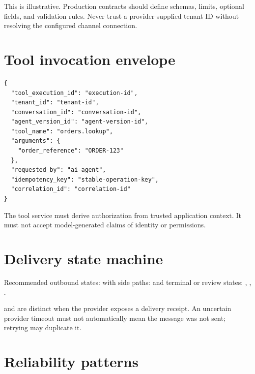 This is illustrative. Production contracts should define schemas, limits, optional fields, and validation rules. Never trust a provider-supplied tenant ID without resolving the configured channel connection.

\section{Tool invocation envelope}

\begin{lstlisting}
{
  "tool_execution_id": "execution-id",
  "tenant_id": "tenant-id",
  "conversation_id": "conversation-id",
  "agent_version_id": "agent-version-id",
  "tool_name": "orders.lookup",
  "arguments": {
    "order_reference": "ORDER-123"
  },
  "requested_by": "ai-agent",
  "idempotency_key": "stable-operation-key",
  "correlation_id": "correlation-id"
}
\end{lstlisting}

The tool service must derive authorization from trusted application context. It must not accept model-generated claims of identity or permissions.

\section{Delivery state machine}

Recommended outbound states:  with side paths:  and terminal or review states: , , .

 and  are distinct when the provider exposes a delivery receipt. An uncertain provider timeout must not automatically mean the message was not sent; retrying may duplicate it.

\section{Reliability patterns}

